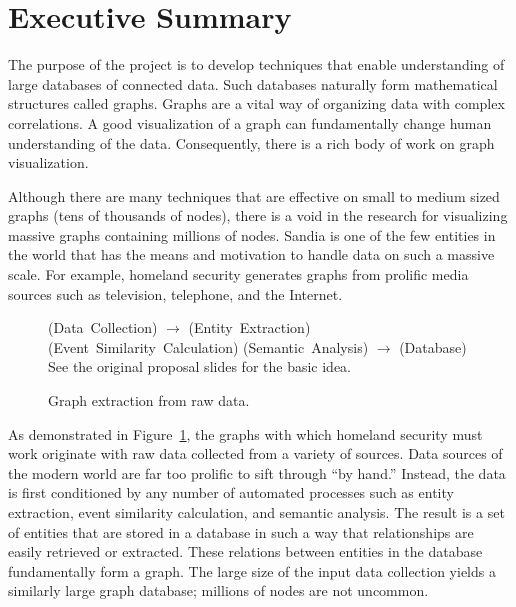\documentclass[pdf,12pt,report,strict]{SANDreport}
\begin{document}


\cleardoublepage		%
\chapter*{Executive Summary}

The purpose of the project is to develop techniques that enable
understanding of large databases of connected data.  Such databases
naturally form mathematical structures called graphs.  Graphs are a vital
way of organizing data with complex correlations.  A good visualization of
a graph can fundamentally change human understanding of the data.
Consequently, there is a rich body of work on graph visualization.

Although there are many techniques that are effective on small to medium
sized graphs (tens of thousands of nodes), there is a void in the research
for visualizing massive graphs containing millions of nodes.  Sandia is one
of the few entities in the world that has the means and motivation to
handle data on such a massive scale.  For example, homeland security
generates graphs from prolific media sources such as television, telephone,
and the Internet.

\begin{figure}
  \centering
  (Data~Collection) $\rightarrow$ (Entity~Extraction)
  (Event~Similarity~Calculation) (Semantic~Analysis) $\rightarrow$
  (Database)
  \\
  See the original proposal slides for the basic idea.
  \caption{Graph extraction from raw data.}
  \label{fig:GraphExtraction}
\end{figure}

As demonstrated in Figure~\ref{fig:GraphExtraction}, the graphs with which
homeland security must work originate with raw data collected from a
variety of sources.  Data sources of the modern world are far too prolific
to sift through ``by hand.''  Instead, the data is first conditioned by any
number of automated processes such as entity extraction, event similarity
calculation, and semantic analysis.  The result is a set of entities that
are stored in a database in such a way that relationships are easily
retrieved or extracted.  These relations between entities in the database
fundamentally form a graph.  The large size of the input data collection
yields a similarly large graph database; millions of nodes are not
uncommon.
\end{document}
